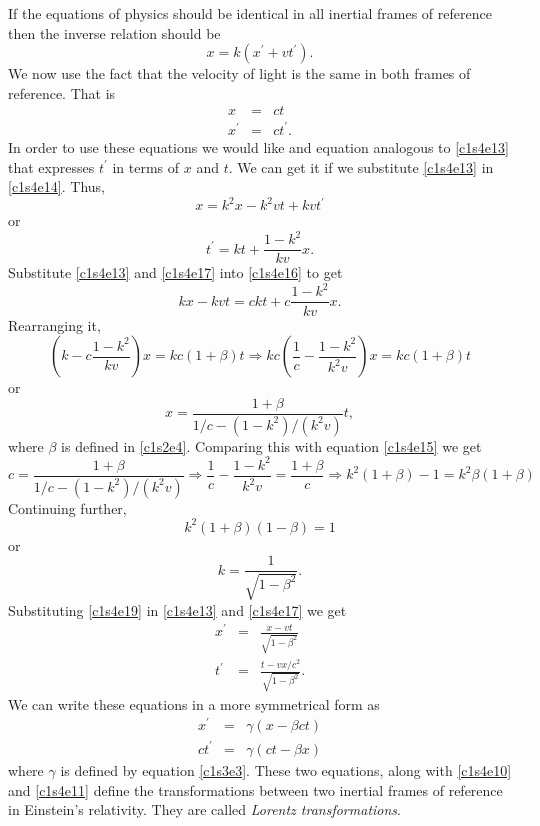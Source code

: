 If the equations of physics should be identical in all inertial frames of 
reference then the inverse relation should be
\begin{equation}\label{c1s4e14}
x = k(x^\prime + vt^\prime).
\end{equation}
We now use the fact that the velocity of light is the same in both frames of
reference. That is
\begin{eqnarray}
x &=& ct \label{c1s4e15} \\
x^\prime &=& ct^\prime. \label{c1s4e16}
\end{eqnarray}
In order to use these equations we would like and equation analogous to 
\eqref{c1s4e13} that expresses $t^\prime$ in terms of $x$ and $t$. We can get
it if we substitute \eqref{c1s4e13} in \eqref{c1s4e14}. Thus,
\[
x = k^2x - k^2vt + kvt^\prime
\]
or
\begin{equation}\label{c1s4e17}
t^\prime = kt + \frac{1 - k^2}{kv}x.
\end{equation}
Substitute \eqref{c1s4e13} and \eqref{c1s4e17} into \eqref{c1s4e16} to get
\begin{equation}\label{c1s4e18}
kx - kvt = ckt + c\frac{1 - k^2}{kv}x.
\end{equation}
Rearranging it,
\[
\left(k - c\frac{1 - k^2}{kv}\right)x = kc(1 + \beta)t \Rightarrow
kc\left(\frac{1}{c} - \frac{1 - k^2}{k^2v}\right)x = kc(1 + \beta)t
\]
or
\[
x = \frac{1 + \beta}{1/c - (1 - k^2)/(k^2v)}t,
\]
where $\beta$ is defined in \eqref{c1s2e4}. Comparing this with equation 
\eqref{c1s4e15} we get
\[
c = \frac{1 + \beta}{1/c - (1 - k^2)/(k^2v)} \Rightarrow
\frac{1}{c} - \frac{1 - k^2}{k^2v} = \frac{1 + \beta}{c} \Rightarrow
k^2(1 + \beta) - 1 = k^2\beta(1 + \beta)
\]
Continuing further,
\[
k^2(1 + \beta)(1 - \beta) = 1
\]
or
\begin{equation}\label{c1s4e19}
k = \frac{1}{\sqrt{1 - \beta^2}}.
\end{equation}
Substituting \eqref{c1s4e19} in \eqref{c1s4e13} and \eqref{c1s4e17} we get
\begin{eqnarray}
x^\prime &=& \frac{x - vt}{\sqrt{1 - \beta^2}} \label{c1s4e20} \\
t^\prime &=& \frac{t - vx/c^2}{\sqrt{1 - \beta^2}}. \label{c1s4e21}
\end{eqnarray}
We can write these equations in a more symmetrical form as
\begin{eqnarray}
x^\prime &=& \gamma(x - \beta ct) \label{c1s4e22} \\
ct^\prime &=& \gamma(ct - \beta x) \label{c1s4e23}
\end{eqnarray}
where $\gamma$ is defined by equation \eqref{c1s3e3}. These two equations, along
with \eqref{c1s4e10} and \eqref{c1s4e11} define the transformations between two
inertial frames of reference in Einstein's relativity. They are called \emph{
Lorentz transformations}.

